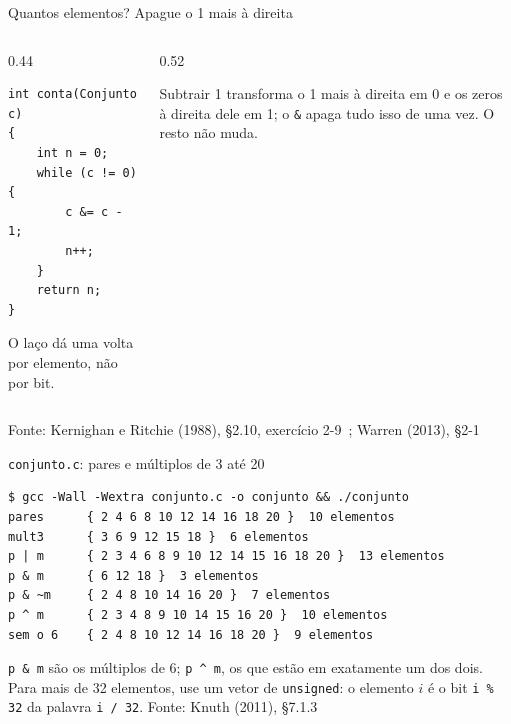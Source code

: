 \documentclass[aspectratio=169]{beamer}
\newcommand{\cir}{\textasciicircum}
\newcommand{\bits}[3]{%
  \foreach \b [count=\k from 0] in {#3} {
    \node[bit\b] at (#1+0.42*\k, #2) {\b};
  }
}
\newcommand{\fonte}[1]{\vfill\hfill{\scriptsize\textcolor{UFSGray}{Fonte: #1}}}
\begin{document}
\begin{frame}[fragile]{Quantos elementos? Apague o 1 mais à direita}
  \begin{columns}[c]
    \begin{column}{0.44\textwidth}
\begin{lstlisting}[style=codC]
int conta(Conjunto c)
{
    int n = 0;
    while (c != 0) {
        c &= c - 1;
        n++;
    }
    return n;
}
\end{lstlisting}
      \small O laço dá uma volta por elemento, não por bit.
    \end{column}
    \begin{column}{0.52\textwidth}
      \begin{center}
      \end{center}
      \small Subtrair 1 transforma o 1 mais à direita em 0 e os zeros à
      direita dele em 1; o \texttt{\&} apaga tudo isso de uma vez. O resto
      não muda.
    \end{column}
  \end{columns}
  \fonte{Kernighan e Ritchie (1988), §2.10, exercício 2-9~\cite{kernighan1988c};
    Warren (2013), §2-1~\cite{warren2013hackers}}
\end{frame}

\begin{frame}[fragile]{\texttt{conjunto.c}: pares e múltiplos de 3 até 20}
\begin{lstlisting}[style=shellStyle]
$ gcc -Wall -Wextra conjunto.c -o conjunto && ./conjunto
pares      { 2 4 6 8 10 12 14 16 18 20 }  10 elementos
mult3      { 3 6 9 12 15 18 }  6 elementos
p | m      { 2 3 4 6 8 9 10 12 14 15 16 18 20 }  13 elementos
p & m      { 6 12 18 }  3 elementos
p & ~m     { 2 4 8 10 14 16 20 }  7 elementos
p ^ m      { 2 3 4 8 9 10 14 15 16 20 }  10 elementos
sem o 6    { 2 4 8 10 12 14 16 18 20 }  9 elementos
\end{lstlisting}
  \small \texttt{p \& m} são os múltiplos de 6; \texttt{p \cir{} m}, os que
  estão em exatamente um dos dois. Para mais de 32 elementos, use um vetor de
  \texttt{unsigned}: o elemento $i$ é o bit \texttt{i \% 32} da palavra
  \texttt{i / 32}.
  \fonte{Knuth (2011), §7.1.3~\cite{knuth2011art}}
\end{frame}
\end{document}
